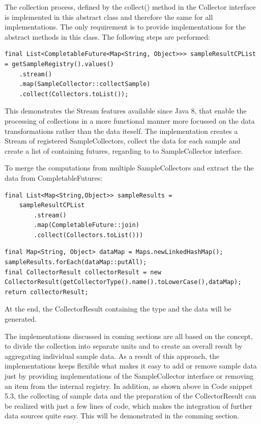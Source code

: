 The collection process, defined by the collect() method in the Collector interface is implemented in this abstract class and
therefore the same for all implementations. The only requirement is to provide implementations for the abstract methods in this class.
The following steps are performed:
\begin{lstlisting}[caption={"AbstractCollector" Fetch sample futures}, captionpos=b, label={lst:abstract-collector-step-one}]
final List<CompletableFuture<Map<String, Object>>> sampleResultCPList = getSampleRegistry().values()
    .stream()
    .map(SampleCollector::collectSample)
    .collect(Collectors.toList());
\end{lstlisting}

This demonstrates the Stream features available since Java 8, that enable the processing of collections in a
more functional manner more focussed on the data transformations rather than the data iteself. The
implementation creates a Stream of registered SampleCollectors, collect the data for each sample and create a list of containing
futures, regarding to to SampleCollector interface.

To merge the computations from multiple SampleCollectors and extract the the data from CompletableFutures:

\begin{lstlisting}[caption={"AbstractCollector" Merge and extract data }, captionpos=b, label={lst:abstract-collector-step-two}]
final List<Map<String,Object>> sampleResults =
    sampleResultCPList
        .stream()
        .map(CompletableFuture::join)
        .collect(Collectors.toList()))
\end{lstlisting}

\begin{lstlisting}[caption={"AbstractCollector" Create CollectorResult}, captionpos=b, label={lst:abstract-collector-step-three}]
final Map<String, Object> dataMap = Maps.newLinkedHashMap();
sampleResults.forEach(dataMap::putAll);
final CollectorResult collectorResult = new CollectorResult(getCollectorType().name().toLowerCase(),dataMap);
return collectorResult;
\end{lstlisting}

At the end, the CollectorResult containing the type and the data will be generated.

The implementations discussed in coming sections are all based on the concept, to divide the collection into separate units and
to create an overall result by aggregating individual sample data. As a result of this approach, the implementations keeps flexible
what makes it easy to add or remove sample data just by providing implementations of the SampleCollector interface or removing
an item from the internal registry. In addition, as shown above in Code snippet 5.3, the collecting of sample data and the
preparation of the CollectorResult can be realized with just a few lines of code, which makes the integration of
further data sources quite easy. This will be demonstrated in the comming section.

